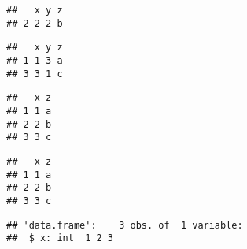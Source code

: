 \begin{verbatim}
##   x y z
## 2 2 2 b
\end{verbatim}

\begin{Shaded}
\begin{Highlighting}[]
\NormalTok{df[}\NormalTok{(}\NormalTok{, }\NormalTok{), ]}
\end{Highlighting}
\end{Shaded}

\begin{verbatim}
##   x y z
## 1 1 3 a
## 3 3 1 c
\end{verbatim}

\begin{Shaded}
\begin{Highlighting}[]
\NormalTok{df[}\NormalTok{(}\NormalTok{, }\NormalTok{)]}
\end{Highlighting}
\end{Shaded}

\begin{verbatim}
##   x z
## 1 1 a
## 2 2 b
## 3 3 c
\end{verbatim}

\begin{Shaded}
\begin{Highlighting}[]
\NormalTok{df[, }\NormalTok{(}\NormalTok{, }\NormalTok{)]}
\end{Highlighting}
\end{Shaded}

\begin{verbatim}
##   x z
## 1 1 a
## 2 2 b
## 3 3 c
\end{verbatim}

\begin{Shaded}
\begin{Highlighting}[]
\NormalTok{(df[}\NormalTok{])}
\end{Highlighting}
\end{Shaded}

\begin{verbatim}
## 'data.frame':    3 obs. of  1 variable:
##  $ x: int  1 2 3
\end{verbatim}

